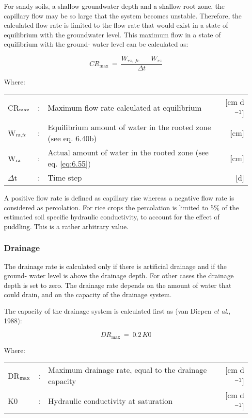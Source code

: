 For sandy soils, a shallow groundwater depth and a shallow root zone, the capillary flow
may be so large that the system becomes unstable. Therefore, the calculated flow rate is
limited to the flow rate that would exist in a state of equilibrium with the groundwater
level. This maximum flow in a state of equilibrium with the ground- water level can be
calculated as:

\begin{equation}
CR_{\max} ~=~{\frac{W_{rz,\, fc} ~-~ W_{rz} }{\Delta t}}
\end{equation}

Where:\\[5pt]
\begin{tabularx}{\textwidth}{llXr}
CR$_{{\rm max}}$ &:& Maximum flow rate calculated at equilibrium  & [cm d$^{{\rm -1}}$]\\
W$_{{\rm rz,fc}}$ &:& Equilibrium amount of water in the rooted
   zone (see eq. 6.40b)  & [cm]\\
W$_{{\rm rz}}$ &:& Actual amount of water in the rooted zone (see eq. \ref{eq:6.55}) & [cm]\\
$\Delta$t &:& Time step  & [d]\\
\end{tabularx}

A positive flow rate is defined as capillary rise whereas a negative flow rate is considered
as percolation. For rice crops the percolation is limited to 5\% of the estimated soil
specific hydraulic conductivity, to account for the effect of puddling. This is a rather
arbitrary value.

\subsubsection{Drainage}
The drainage rate is calculated only if there is artificial drainage and if the ground- water
level is above the drainage depth. For other cases the drainage depth is set to zero.
The drainage rate depends on the amount of water that could drain, and on the capacity of
the drainage system.

The capacity of the drainage system is calculated first as (van Diepen {\it et al}., 1988):

\begin{equation}
\label{eq:6.42}
DR _{\max } ~=~ 0.2\, K0
\end{equation}

Where:\\[5pt]
\begin{tabularx}{\textwidth}{llXr}
DR$_{{\rm max}}$ &:& Maximum drainage rate, equal to the drainage capacity  & [cm d$^{{\rm -1}}$]\\
K0 &:& Hydraulic conductivity at saturation   & [cm d$^{{\rm -1}}$]\\
\end{tabularx}

